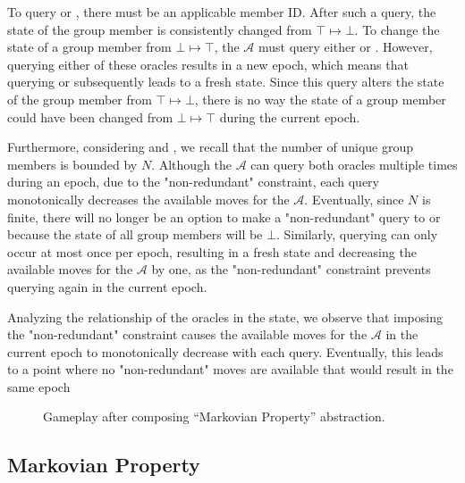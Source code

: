 \documentclass[runningheads]{llncs}
\newcommand{\Adversary}{\ensuremath{\mathcal{A}}\xspace}
\begin{document}
To query  or , there must be an applicable member ID. After such a query, the state of the group member is consistently changed from $\top \mapsto \bot$. To change the state of a group member from $\bot \mapsto \top$, the \Adversary must query either  or . However, querying either of these oracles results in a new epoch, which means that querying  or  subsequently leads to a fresh state. Since this query alters the state of the group member from $\top \mapsto \bot$, there is no way the state of a group member could have been changed from $\bot \mapsto \top$ during the current epoch.

Furthermore, considering  and , we recall that the number of unique group members is bounded by $N$. Although the \Adversary can query both oracles multiple times during an epoch, due to the "non-redundant" constraint, each query monotonically decreases the available moves for the \Adversary. Eventually, since $N$ is finite, there will no longer be an option to make a "non-redundant" query to  or  because the state of all group members will be $\bot$. Similarly, querying  can only occur at most once per epoch, resulting in a fresh state and decreasing the available moves for the \Adversary by one, as the "non-redundant" constraint prevents querying  again in the current epoch.

Analyzing the relationship of the oracles in the \CGKAsec state, we observe that imposing the "non-redundant" constraint causes the available moves for the \Adversary in the current epoch to monotonically decrease with each query. Eventually, this leads to a point where no "non-redundant" moves are available that would result in the same epoch

\begin{figure}
\centering
{}
\caption[Transition graph of informal CGKA definition]{%
\label{fig:CGKA-Progressing}%
Gameplay after composing ``Required Progression'' abstraction.%
}%
\vfill
{}
\caption[Transition graph of informal CGKA definition]{%
\label{fig:CGKA-Markovian}%
Gameplay after composing ``Markovian Property'' abstraction.%
}%
\end{figure}


\subsection{Markovian Property}
\end{document}
